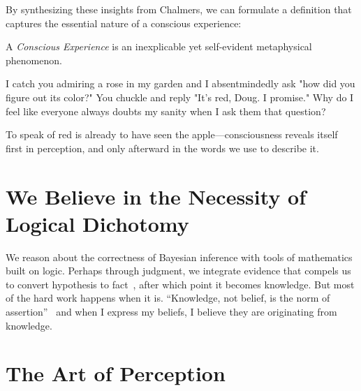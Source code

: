 \documentclass[runningheads]{llncs}
\begin{document}
By synthesizing these insights from Chalmers, we can formulate a definition that captures the essential nature of a conscious experience:

\setcounter{definition}{0}
\begin{cdefinition}
	A \textit{Conscious Experience} is an inexplicable yet self-evident metaphysical phenomenon.
\end{cdefinition}

\setcounter{definition}{0}
\begin{cexample}
I catch you admiring a rose in my garden and I absentmindedly ask "how did you figure out its color?" You chuckle and reply "It's red, Doug. I promise." Why do I feel like everyone always doubts my sanity when I ask them that question?
\end{cexample}

To speak of red is already to have seen the apple—consciousness reveals itself first in perception, and only afterward in the words we use to describe it.

\section{We Believe in the Necessity of Logical Dichotomy}

We reason about the correctness of Bayesian inference with tools of mathematics built on logic. Perhaps through judgment, we integrate evidence that compels us to convert hypothesis to fact~\cite{OFlanagan2008}, after which point it becomes knowledge. But most of the hard work happens when it is. ``Knowledge, not belief, is the norm of assertion''~\cite{Williamson2000} and when I express my beliefs, I believe they are originating from knowledge.

\section{The Art of Perception}

\end{document}
